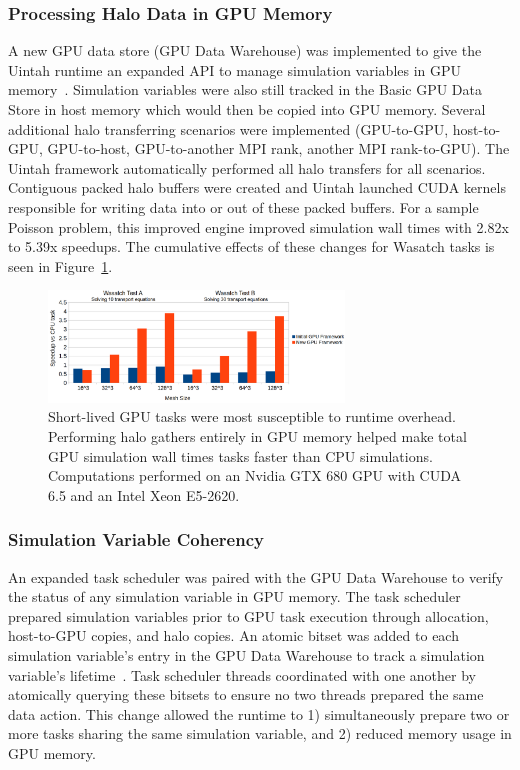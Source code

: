 \documentclass[12pt]{article}
\begin{document}
\subsubsection{Processing Halo Data in GPU Memory}
\label{ch:processing_halo_data_gpu_memory}



A new GPU data store (GPU Data Warehouse) was implemented to give the Uintah runtime an expanded API to manage simulation variables in GPU memory~\cite{wolfhpc15}.  Simulation variables were also still tracked in the Basic GPU Data Store in host memory which would then be copied into GPU memory.  Several additional halo transferring scenarios were implemented (GPU-to-GPU, host-to-GPU, GPU-to-host, GPU-to-another MPI rank, another MPI rank-to-GPU). The Uintah framework automatically performed all halo transfers for all scenarios.   Contiguous packed halo buffers were created and Uintah launched CUDA kernels responsible for writing data into or out of these packed buffers.  For a sample Poisson problem, this improved engine improved simulation wall times with 2.82x to 5.39x speedups.   The cumulative effects of these changes for Wasatch tasks is seen in Figure~\ref{fig:wasatch-speedups}.  

\begin{figure}
	\centering
	\includegraphics[width=0.70\textwidth]{figures/wasatch_test_bar_chart-highquality.png}
	\caption{Short-lived GPU tasks were most susceptible to runtime overhead.  Performing halo gathers entirely in GPU memory helped make total GPU simulation wall times tasks faster than CPU simulations.  Computations performed on an Nvidia GTX 680 GPU with CUDA 6.5 and an Intel Xeon E5-2620.}
	\label{fig:wasatch-speedups}
\end{figure}

\subsubsection{Simulation Variable Coherency}
\label{ch:simulation_variable_coherency}

An expanded task scheduler was paired with the GPU Data Warehouse to verify the status of any simulation variable in GPU memory.  The task scheduler prepared simulation variables prior to GPU task execution through allocation, host-to-GPU copies, and halo copies.  An atomic bitset was added to each simulation variable’s entry in the GPU Data Warehouse to track a simulation variable’s lifetime~\cite{ijpp16}.  Task scheduler threads coordinated with one another by atomically querying these bitsets to ensure no two threads prepared the same data action.  This change allowed the runtime to 1) simultaneously prepare two or more tasks sharing the same simulation variable, and 2) reduced memory usage in GPU memory.
\end{document}
